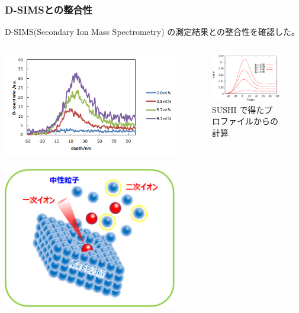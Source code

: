 \documentclass[unicode,12pt]{beamer}%
\begin{document}
\begin{frame}\frametitle{D-SIMSとの整合性}
D-SIMS(Secondary Ion Mass Spectrometry) の測定結果との整合性を確認した。
	\begin{columns}
		\begin{column}{6cm}
				\centering
				\includegraphics[width=.8\textwidth]{D_SIMS_exp.png}

					\includegraphics[width=.6\textwidth]{SIMS.jpg}
			
					
		\end{column}
		\begin{column}{5cm}
			\begin{figure}[htbp]
				\begin{center}
					\includegraphics[width=50mm]{Chi_03_Lf_4.0_SIMS_4.eps}
				\end{center}
				\caption{SUSHI で得たプロファイルからの計算}
		\end{figure}
		\end{column}
	\end{columns}
\end{frame}
\end{document}
